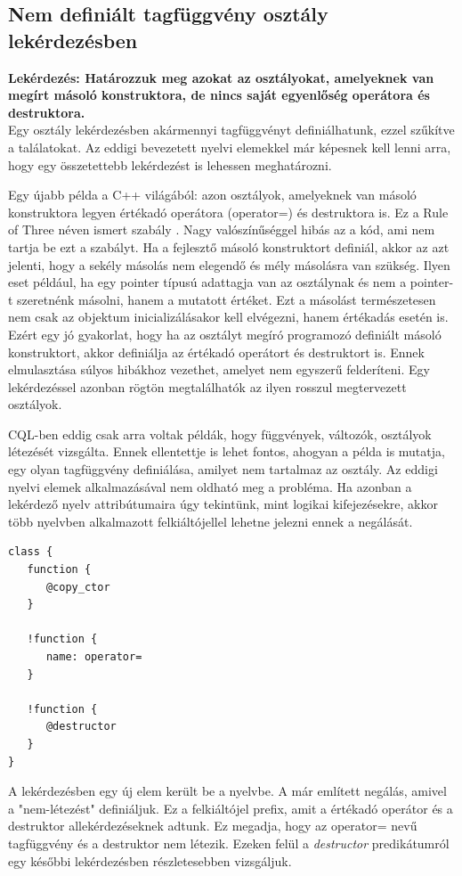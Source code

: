 \documentclass[a4paper,12pt]{report}
\begin{document}
\subsection{Nem definiált tagfüggvény osztály lekérdezésben}
\textbf{Lekérdezés: Határozzuk meg azokat az osztályokat, amelyeknek van megírt másoló konstruktora, de nincs saját egyenlőség operátora és destruktora.}
\\
Egy osztály lekérdezésben akármennyi tagfüggvényt definiálhatunk, ezzel szűkítve a találatokat. Az eddigi bevezetett nyelvi elemekkel már képesnek kell lenni arra, hogy egy összetettebb lekérdezést is lehessen meghatározni.
\par Egy újabb példa a C++ világából: azon osztályok, amelyeknek van másoló konstruktora legyen értékadó operátora (operator=) és destruktora is. Ez a Rule of Three néven ismert szabály \cite{rule_of_three}. Nagy valószínűséggel hibás az a kód, ami nem tartja be ezt a szabályt. Ha a fejlesztő másoló konstruktort definiál, akkor az azt jelenti, hogy a sekély másolás nem elegendő és mély másolásra van szükség. Ilyen eset például, ha egy pointer típusú adattagja van az osztálynak és nem a pointer-t szeretnénk másolni, hanem a mutatott értéket. Ezt a másolást természetesen nem csak az objektum inicializálásakor kell elvégezni, hanem értékadás esetén is. Ezért egy jó gyakorlat, hogy ha az osztályt megíró programozó definiált másoló konstruktort, akkor definiálja az értékadó operátort és destruktort is. Ennek elmulasztása súlyos hibákhoz vezethet, amelyet nem egyszerű felderíteni. Egy lekérdezéssel azonban rögtön megtalálhatók az ilyen rosszul megtervezett osztályok.
\par CQL-ben eddig csak arra voltak példák, hogy függvények, változók, osztályok létezését vizsgálta. Ennek ellentettje is lehet fontos, ahogyan a példa is mutatja, egy olyan tagfüggvény definiálása, amilyet nem tartalmaz az osztály. Az eddigi nyelvi elemek alkalmazásával nem oldható meg a probléma. Ha azonban a lekérdező nyelv attribútumaira úgy tekintünk, mint logikai kifejezésekre, akkor több nyelvben alkalmazott felkiáltójellel lehetne jelezni ennek a negálását.
\begin{verbatim}
class {
   function { 
      @copy_ctor
   }
   
   !function {
      name: operator=
   }
   
   !function {
      @destructor
   }
}
\end{verbatim}
\par A lekérdezésben egy új elem került be a nyelvbe. A már említett negálás, amivel a "nem-létezést" definiáljuk. Ez a felkiáltójel prefix, amit a értékadó operátor és a destruktor allekérdezéseknek  adtunk. Ez megadja, hogy az operator= nevű tagfüggvény és a destruktor nem létezik. Ezeken felül a \textit{destructor} predikátumról egy későbbi lekérdezésben részletesebben vizsgáljuk.
\end{document}
